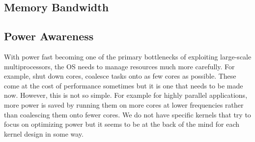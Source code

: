 \subsection{Memory Bandwidth}

\subsection{Power Awareness}
With power fast becoming one of the primary bottlenecks of exploiting large-scale multiprocessors, the OS needs to manage resources much more carefully. For example, shut down cores, coalesce tasks onto as few cores as possible. These come at the cost of performance sometimes but it is one that needs to be made now. However, this is not so simple. For example for highly parallel applications, more power is saved by running them on more cores at lower frequencies rather than coalescing them onto fewer cores.
We do not have specific kernels that try to focus on optimizing power but it seems to be at the back of the mind for each kernel design in some way.
